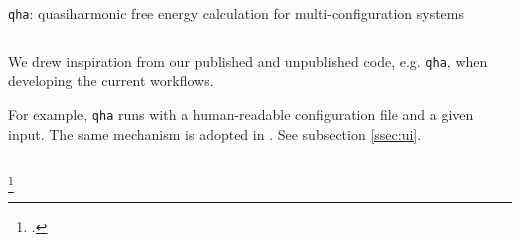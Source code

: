 \begin{frame}{\texttt{qha}: quasiharmonic free energy calculation for multi-configuration systems}
    \begin{columns}[t]
        \begin{column}{0.4\textwidth}
            We drew inspiration from our published and unpublished code, e.g. \texttt{qha},
            when developing the current workflows.

            For example, \texttt{qha} runs with a human-readable
            configuration file and a given input.
            The same mechanism is adopted in \express{}.
            See subsection \ref{ssec:ui}.
        \end{column}

        \begin{column}{0.6\textwidth}
        \end{column}
    \end{columns}
    \footcitetext{QIN2019199}

\end{frame}
